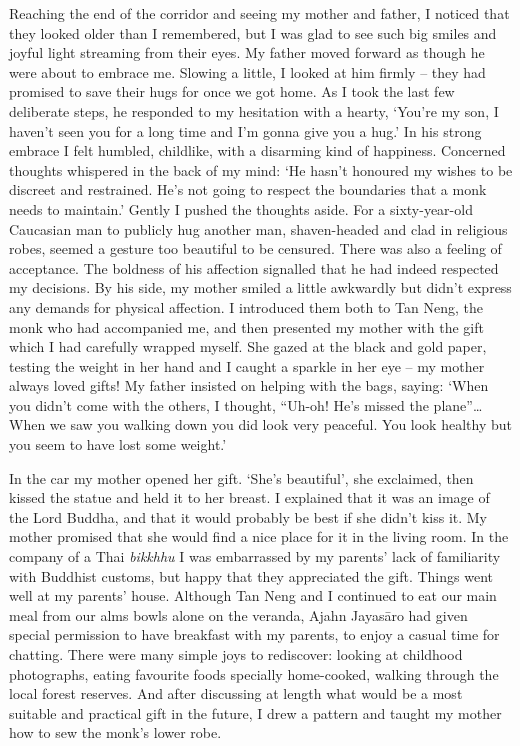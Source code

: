 Reaching the end of the corridor and seeing my mother and father, I
noticed that they looked older than I remembered, but I was glad to see
such big smiles and joyful light streaming from their eyes. My father
moved forward as though he were about to embrace me. Slowing a little, I
looked at him firmly -- they had promised to save their hugs for once
we got home. As I took the last few deliberate steps, he responded to my
hesitation with a hearty, `You're my son, I haven't seen you for a long
time and I'm gonna give you a hug.' In his strong embrace I felt
humbled, childlike, with a disarming kind of happiness. Concerned
thoughts whispered in the back of my mind: `He hasn't honoured my wishes
to be discreet and restrained. He's not going to respect the boundaries
that a monk needs to maintain.' Gently I pushed the thoughts aside. For
a sixty-year-old Caucasian man to publicly hug another man, 
shaven-headed and clad in religious robes, seemed a gesture too
beautiful to be censured. There was also a feeling of acceptance. The
boldness of his affection signalled that he had indeed respected my
decisions. By his side, my mother smiled a little awkwardly but didn't
express any demands for physical affection. I introduced them both to
Tan Neng, the monk who had accompanied me, and then presented my mother
with the gift which I had carefully wrapped myself. She gazed at the
black and gold paper, testing the weight in her hand and I caught a
sparkle in her eye -- my mother always loved gifts! My father insisted
on helping with the bags, saying: `When you didn't come with the others, 
I thought, ``Uh-oh! He's missed the plane''\ldots{} When we saw you
walking down you did look very peaceful. You look healthy but you seem
to have lost some weight.'

In the car my mother opened her gift. `She's beautiful', she exclaimed, 
then kissed the statue and held it to her breast. I explained that it
was an image of the Lord Buddha, and that it would probably be best if
she didn't kiss it. My mother promised that she would find a nice place
for it in the living room. In the company of a Thai \emph{bikkhhu} I was
embarrassed by my parents' lack of familiarity with Buddhist customs, 
but happy that they appreciated the gift. Things went well at my
parents' house. Although Tan Neng and I continued to eat our main meal
from our alms bowls alone on the veranda, Ajahn Jayasāro had given
special permission to have breakfast with my parents, to enjoy a casual
time for chatting. There were many simple joys to rediscover: looking at
childhood photographs, eating favourite foods specially home-cooked, 
walking through the local forest reserves. And after discussing at
length what would be a most suitable and practical gift in the future, I
drew a pattern and taught my mother how to sew the monk's lower robe. 

